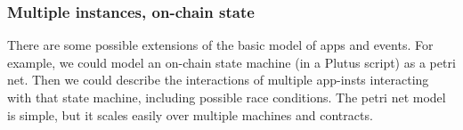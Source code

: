 \subsubsection{Multiple instances, on-chain state}

There are some possible extensions of the basic model of apps and events.
For example, we could model an on-chain state machine (in a Plutus script) as a petri net.
Then we could describe the interactions of multiple \glspl{app-inst} interacting with that state machine, including possible race conditions.
The petri net model is simple, but it scales easily over multiple machines and contracts.